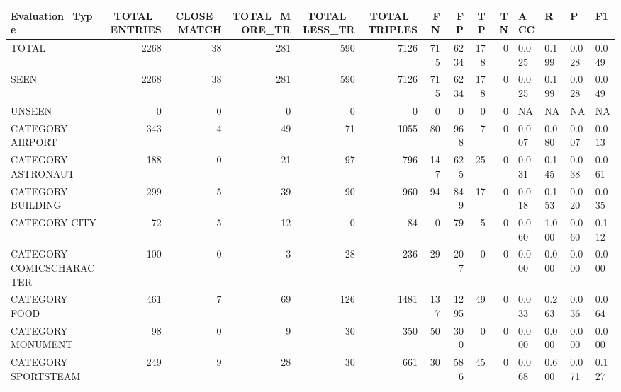 \begin{tabular}{lrrrrrrrrrllll}
\hline
 Evaluation\_Type          &   TOTAL\_ENTRIES &   CLOSE\_MATCH &   TOTAL\_MORE\_TR &   TOTAL\_LESS\_TR &   TOTAL\_TRIPLES &   FN &   FP &   TP &   TN & ACC   & R     & P     & F1    \\
\hline
 TOTAL                    &            2268 &            38 &             281 &             590 &            7126 &  715 & 6234 &  178 &    0 & 0.025 & 0.199 & 0.028 & 0.049 \\
 SEEN                     &            2268 &            38 &             281 &             590 &            7126 &  715 & 6234 &  178 &    0 & 0.025 & 0.199 & 0.028 & 0.049 \\
 UNSEEN                   &               0 &             0 &               0 &               0 &               0 &    0 &    0 &    0 &    0 & NA    & NA    & NA    & NA    \\
 CATEGORY AIRPORT         &             343 &             4 &              49 &              71 &            1055 &   80 &  968 &    7 &    0 & 0.007 & 0.080 & 0.007 & 0.013 \\
 CATEGORY ASTRONAUT       &             188 &             0 &              21 &              97 &             796 &  147 &  625 &   25 &    0 & 0.031 & 0.145 & 0.038 & 0.061 \\
 CATEGORY BUILDING        &             299 &             5 &              39 &              90 &             960 &   94 &  849 &   17 &    0 & 0.018 & 0.153 & 0.020 & 0.035 \\
 CATEGORY CITY            &              72 &             5 &              12 &               0 &              84 &    0 &   79 &    5 &    0 & 0.060 & 1.000 & 0.060 & 0.112 \\
 CATEGORY COMICSCHARACTER &             100 &             0 &               3 &              28 &             236 &   29 &  207 &    0 &    0 & 0.000 & 0.000 & 0.000 & 0.000 \\
 CATEGORY FOOD            &             461 &             7 &              69 &             126 &            1481 &  137 & 1295 &   49 &    0 & 0.033 & 0.263 & 0.036 & 0.064 \\
 CATEGORY MONUMENT        &              98 &             0 &               9 &              30 &             350 &   50 &  300 &    0 &    0 & 0.000 & 0.000 & 0.000 & 0.000 \\
 CATEGORY SPORTSTEAM      &             249 &             9 &              28 &              30 &             661 &   30 &  586 &   45 &    0 & 0.068 & 0.600 & 0.071 & 0.127 \\

\end{tabular}
